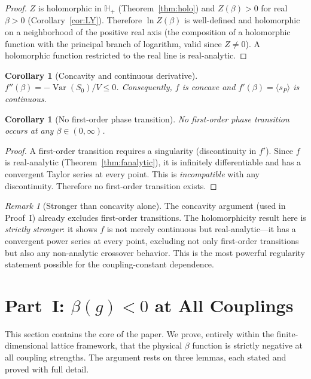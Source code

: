 \documentclass[12pt,a4paper]{article}
\theoremstyle{plain}
\newtheorem{corollary}[theorem]{Corollary}
\theoremstyle{definition}
\theoremstyle{remark}
\newtheorem{remark}[theorem]{Remark}
\begin{document}
\begin{proof}
$Z$ is holomorphic in $\mathbb{H}_+$ (Theorem~\ref{thm:holo}) and $Z(\beta)>0$ for real $\beta>0$ (Corollary~\ref{cor:LY}). Therefore $\ln Z(\beta)$ is well-defined and holomorphic on a neighborhood of the positive real axis (the composition of a holomorphic function with the principal branch of logarithm, valid since $Z\neq 0$). A holomorphic function restricted to the real line is real-analytic.
\end{proof}

\begin{corollary}[Concavity and continuous derivative]\label{cor:concave}
$f''(\beta)=-\operatorname{Var}(S_0)/V\leq 0$. Consequently, $f$ is concave and $f'(\beta)=\langle s_P\rangle$ is continuous.
\end{corollary}

\begin{corollary}[No first-order phase transition]\label{cor:no1st}
No first-order phase transition occurs at any $\beta\in(0,\infty)$.
\end{corollary}

\begin{proof}
A first-order transition requires a singularity (discontinuity in $f'$). Since $f$ is real-analytic (Theorem~\ref{thm:fanalytic}), it is infinitely differentiable and has a convergent Taylor series at every point. This is \emph{incompatible} with any discontinuity. Therefore no first-order transition exists.
\end{proof}

\begin{remark}[Stronger than concavity alone]\label{rem:stronger}
The concavity argument (used in Proof~I) already excludes first-order transitions. The holomorphicity result here is \emph{strictly stronger}: it shows $f$ is not merely continuous but real-analytic---it has a convergent power series at every point, excluding not only first-order transitions but also any non-analytic crossover behavior. This is the most powerful regularity statement possible for the coupling-constant dependence.
\end{remark}
\section{Part~I: $\beta(g)<0$ at All Couplings}\label{sec:betaneg}

This section contains the core of the paper. We prove, entirely within the finite-dimensional lattice framework, that the physical $\beta$ function is strictly negative at all coupling strengths. The argument rests on three lemmas, each stated and proved with full detail.
\end{document}

